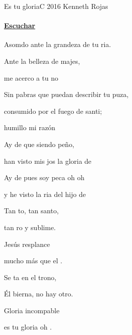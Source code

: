 \documentclass[12pt, spanish]{book}
\begin{document}
    \begin{song}{Es tu gloria}{C}
        {2016} %
        {Kenneth Rojas}
        {} %
        {}
        \ifChordBk
        \paragraph{\mbox{}\hfill\protect\href{https://open.spotify.com/intl-es/track/6RqQ9CNM0OI9MzOzNOfz6o}{Escuchar}\mbox{}\hfill}
        \fi

        \begin{SBOpGroup}
            Asomdo ante la grandeza de tu ria.

            Ante la belleza de  majes,

            me acerco a tu no
        \end{SBOpGroup}
        \vskip 20pt
        \begin{SBOpGroup}
            Sin pabras que puedan describir tu puza,

            consumido por el fuego de  santi;

            humillo mi razón
        \end{SBOpGroup}
        \vskip 20pt
        \begin{SBOpGroup}
            Ay de  que siendo peño,

            han visto mis jos la gloria de 

            Ay de  pues soy peca oh oh

            y he visto la ria    del hijo de    
        \end{SBOpGroup}

        \begin{SBChorus}
            Tan to, tan santo,

            tan ro y sublime.

            Jesús resplance

            mucho más que el .


            Se ta en el trono,

            Él bierna, no hay otro.

            Gloria incompable

            es tu gloria oh .   



\end{SBChorus}
\end{song}
\end{document}
